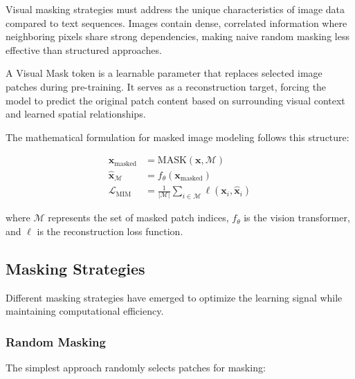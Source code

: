 Visual masking strategies must address the unique characteristics of image data compared to text sequences. Images contain dense, correlated information where neighboring pixels share strong dependencies, making naive random masking less effective than structured approaches.

\begin{definition}
A Visual Mask token is a learnable parameter that replaces selected image patches during pre-training. It serves as a reconstruction target, forcing the model to predict the original patch content based on surrounding visual context and learned spatial relationships.
\end{definition}

The mathematical formulation for masked image modeling follows this structure:

\begin{align}
\mathbf{x}_{\text{masked}} &= \text{MASK}(\mathbf{x}, \mathcal{M}) \\
\hat{\mathbf{x}}_{\mathcal{M}} &= f_{\theta}(\mathbf{x}_{\text{masked}}) \\
\mathcal{L}_{\text{MIM}} &= \frac{1}{|\mathcal{M}|} \sum_{i \in \mathcal{M}} \ell(\mathbf{x}_i, \hat{\mathbf{x}}_i)
\end{align}

where $\mathcal{M}$ represents the set of masked patch indices, $f_{\theta}$ is the vision transformer, and $\ell$ is the reconstruction loss function.

\subsection{Masking Strategies}

Different masking strategies have emerged to optimize the learning signal while maintaining computational efficiency.

\subsubsection{Random Masking}

The simplest approach randomly selects patches for masking:

